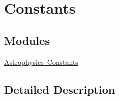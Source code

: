 \hypertarget{group___e_g_x_phys-_constants}{}\section{Constants}
\label{group___e_g_x_phys-_constants}
\subsection*{Modules}
\begin{DoxyCompactItemize}
\item 
\mbox{\hyperlink{group___e_g_x_phys-_constants-_astrophysics}{Astrophysics Constants}}
\end{DoxyCompactItemize}


\subsection{Detailed Description}

